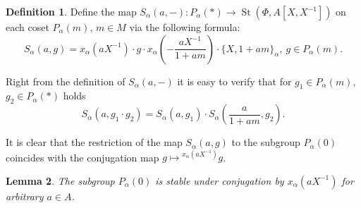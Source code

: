 \documentclass[oneside, 8pt]{amsart}
\newtheorem{lemma}{Lemma}
\theoremstyle{remark}
\theoremstyle{definition}
\newtheorem{df}[lemma]{Definition} \Crefname{df}{Definition}{Definitions}
\DeclareMathOperator{\St}{St}
\numberwithin{equation}{section}
\begin{document}
\begin{df} Define the map $S_\alpha(a, -) \colon P_\alpha(*) \to \St(\Phi, A[X, X^{-1}])$ on each coset $P_\alpha(m)$, $m \in M$ via the following formula:
\[ S_\alpha(a, g) = x_\alpha(aX^{-1})\cdot g \cdot x_\alpha\left(-\frac{aX^{-1}}{1 + am}\right) \cdot \{X, 1+ am\}_\alpha,\ g \in P_\alpha(m).\] \end{df}
Right from the definition of $S_\alpha(a, -)$ it is easy to verify that for $g_1 \in P_\alpha(m)$, $g_2 \in P_\alpha(*)$ holds
\[ S_\alpha(a, g_1\cdot g_2) = S_\alpha(a, g_1) \cdot S_\alpha\left(\frac{a}{1+am}, g_2\right).\]

It is clear that the restriction of the map $S_\alpha(a, g)$ to the subgroup $P_\alpha(0)$ coincides with the conjugation map $g \mapsto {}^{x_\alpha(aX^{-1})}\!g$.

\begin{lemma}\label{P0_conj} The subgroup $P_\alpha(0)$ is stable under conjugation by $x_\alpha(aX^{-1})$ for arbitrary $a\in A$. \end{lemma}
\end{document}
